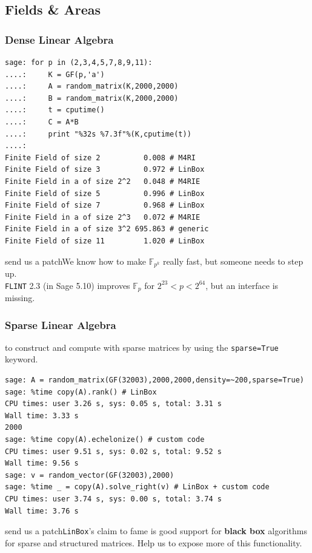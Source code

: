 \documentclass[9pt]{beamer}
\renewcommand{\emph}[1]{\textbf{\color{oxygenorange}#1}\xspace}
\newcommand{\field}[1]{\ensuremath{\mathbb{#1}}}
\newcommand{\F}{\ensuremath{\field{F}}}
\newcommand{\patchit}[1]{\begin{block}{send us a patch}#1\end{block}}
\begin{document}
\subsection{Fields \& Areas}

\begin{frame}[fragile]
\frametitle{Dense Linear Algebra}

\begin{lstlisting}
sage: for p in (2,3,4,5,7,8,9,11):
....:     K = GF(p,'a')
....:     A = random_matrix(K,2000,2000)
....:     B = random_matrix(K,2000,2000)
....:     t = cputime()
....:     C = A*B
....:     print "%32s %7.3f"%(K,cputime(t))
....:
Finite Field of size 2          0.008 # M4RI
Finite Field of size 3          0.972 # LinBox
Finite Field in a of size 2^2   0.048 # M4RIE
Finite Field of size 5          0.996 # LinBox
Finite Field of size 7          0.968 # LinBox
Finite Field in a of size 2^3   0.072 # M4RIE
Finite Field in a of size 3^2 695.863 # generic
Finite Field of size 11         1.020 # LinBox
\end{lstlisting}

\patchit{We know how to make $\F_{p^k}$ really fast, but someone needs to step up.\\
{\tt FLINT} 2.3 (in Sage 5.10) improves $\F_p$ for $2^{23} < p<2^{64}$, but an interface is missing.}

\end{frame}

\begin{frame}[fragile]
\frametitle{Sparse Linear Algebra}

to construct and compute with sparse matrices by using the {\tt sparse=True} keyword.

\begin{lstlisting}
sage: A = random_matrix(GF(32003),2000,2000,density=~200,sparse=True)
sage: %time copy(A).rank() # LinBox
CPU times: user 3.26 s, sys: 0.05 s, total: 3.31 s
Wall time: 3.33 s
2000
sage: %time copy(A).echelonize() # custom code
CPU times: user 9.51 s, sys: 0.02 s, total: 9.52 s
Wall time: 9.56 s
sage: v = random_vector(GF(32003),2000)
sage: %time _ = copy(A).solve_right(v) # LinBox + custom code
CPU times: user 3.74 s, sys: 0.00 s, total: 3.74 s
Wall time: 3.76 s
\end{lstlisting}

\patchit{\texttt{LinBox}'s claim to fame is good support for \emph{black box} algorithms for sparse and structured matrices. Help us to expose more of this functionality.}
\end{frame}
\end{document}
